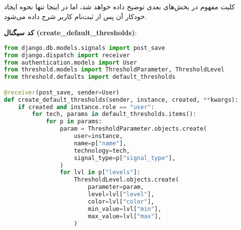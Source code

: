 \documentclass{report}
\begin{document}
کلیت مفهوم  در بخش‌های بعدی توضیح داده خواهد شد، اما در اینجا تنها نحوه ایجاد خودکار آن پس از ثبت‌نام کاربر شرح داده می‌شود. 

\textbf{کد سیگنال (create\_default\_thresholds)}:
\begin{lstlisting}[language=python]
from django.db.models.signals import post_save
from django.dispatch import receiver
from authentication.models import User
from threshold.models import ThresholdParameter, ThresholdLevel
from threshold.defaults import default_thresholds 

@receiver(post_save, sender=User)
def create_default_thresholds(sender, instance, created, **kwargs):
    if created and instance.role == "user": 
        for tech, params in default_thresholds.items():
            for p in params:
                param = ThresholdParameter.objects.create(
                    user=instance,
                    name=p["name"],
                    technology=tech,
                    signal_type=p["signal_type"],
                )
                for lvl in p["levels"]:
                    ThresholdLevel.objects.create(
                        parameter=param,
                        level=lvl["level"],
                        color=lvl["color"],
                        min_value=lvl["min"],
                        max_value=lvl["max"],
                    )
\end{lstlisting}
\end{document}
